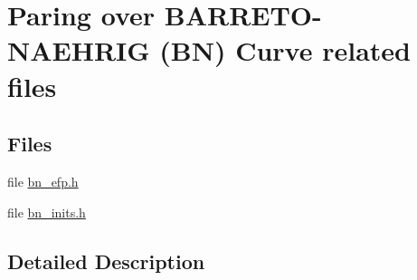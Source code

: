\hypertarget{group__bn12}{}\section{Paring over B\+A\+R\+R\+E\+T\+O-\/\+N\+A\+E\+H\+R\+IG (BN) Curve related files}
\label{group__bn12}
\subsection*{Files}
\begin{DoxyCompactItemize}
\item 
file \hyperlink{bn__efp_8h}{bn\+\_\+efp.\+h}
\item 
file \hyperlink{bn__inits_8h}{bn\+\_\+inits.\+h}
\end{DoxyCompactItemize}


\subsection{Detailed Description}
